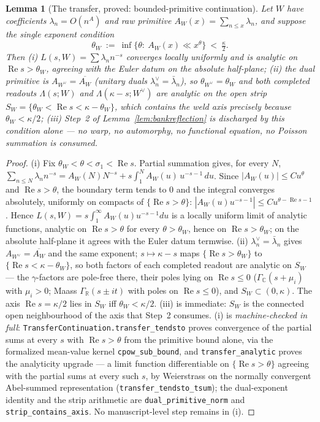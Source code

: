 \documentclass[11pt]{article}
\newtheorem{lemma}[theorem]{Lemma}
\theoremstyle{definition}
\renewcommand{\Re}{\operatorname{Re}}
\begin{document}
\begin{lemma}[The transfer, proved: bounded-primitive continuation]\label{lem:transfer}
Let $W$ have coefficients $\lambda_n=O(n^{A})$ and raw primitive $A_W(x)=\sum_{n\le x}\lambda_n$, and suppose
the single exponent condition
\[
  \theta_W\ :=\ \inf\{\theta:\ A_W(x)\ll x^{\theta}\}\ <\ \tfrac\kappa2 .
\]
Then \textup{(i)} $L(s,W)=\sum\lambda_n n^{-s}$ converges locally
uniformly and is analytic on $\Re s>\theta_W$, agreeing with the Euler datum on the absolute half-plane;
\textup{(ii)} the dual primitive is $A_{W^\vee}=\overline{A_W}$ (unitary duals $\lambda^\vee_n=
\bar\lambda_n$), so $\theta_{W^\vee}=\theta_W$ and \emph{both} completed readouts $\Lambda(s;W)$ and
$\Lambda(\kappa-s;W^\vee)$ are analytic on the open strip
$S_W=\{\theta_W<\Re s<\kappa-\theta_W\}$, which contains the weld axis precisely because
$\theta_W<\kappa/2$; \textup{(iii)} Step~2 of Lemma~\ref{lem:bankreflection} is discharged by this condition
alone --- no warp, no automorphy, no functional equation, no Poisson summation is consumed.
\end{lemma}
\begin{proof}
\textup{(i)} Fix $\theta_W<\theta<\sigma_1<\Re s$. Partial summation gives, for every $N$,
$\sum_{n\le N}\lambda_n n^{-s}=A_W(N)N^{-s}+s\int_1^{N}A_W(u)\,u^{-s-1}\,du$. Since $|A_W(u)|\le C u^{\theta}$
and $\Re s>\theta$, the boundary term tends to $0$ and the integral converges absolutely, uniformly on
compacts of $\{\Re s>\theta\}$: $|A_W(u)u^{-s-1}|\le C u^{\theta-\Re s-1}$. Hence
$L(s,W)=s\int_1^\infty A_W(u)u^{-s-1}du$ is a locally uniform limit of analytic functions, analytic on
$\Re s>\theta$ for every $\theta>\theta_W$, hence on $\Re s>\theta_W$; on the absolute half-plane it agrees
with the Euler datum termwise. \textup{(ii)} $\lambda^\vee_n=\bar\lambda_n$ gives $A_{W^\vee}=\overline{A_W}$
and the same exponent; $s\mapsto\kappa-s$ maps $\{\Re s>\theta_W\}$ to $\{\Re s<\kappa-\theta_W\}$, so both
factors of each completed readout are analytic on $S_W$ --- the $\gamma$-factors are pole-free there, their
poles lying on $\Re s\le0$ ($\Gamma_{\mathbb C}(s+\mu_i)$ with $\mu_i>0$; Maass $\Gamma_{\mathbb R}(s\pm it)$
with poles on $\Re s\le 0$), and $S_W\subset(0,\kappa)$. The axis $\Re s=\kappa/2$ lies in $S_W$ iff
$\theta_W<\kappa/2$. \textup{(iii)} is immediate: $S_W$ is the connected open neighbourhood of the axis that
Step~2 consumes.
\textup{(i)} is \emph{machine-checked in full}: \texttt{TransferContinuation.transfer\_tendsto}
proves convergence of the partial sums at every $s$ with $\Re s>\theta$ from the primitive
bound alone, via the formalized mean-value kernel \texttt{cpow\_sub\_bound}, and
\texttt{transfer\_analytic} proves the analyticity upgrade --- a limit function differentiable on
$\{\Re s>\theta\}$ agreeing with the partial sums at every such $s$, by Weierstrass on the normally
convergent Abel-summed representation (\texttt{transfer\_tendsto\_tsum}); the dual-exponent identity
and the strip arithmetic are \texttt{dual\_primitive\_norm} and \texttt{strip\_contains\_axis}. No
manuscript-level step remains in \textup{(i)}.
\end{proof}
\end{document}
